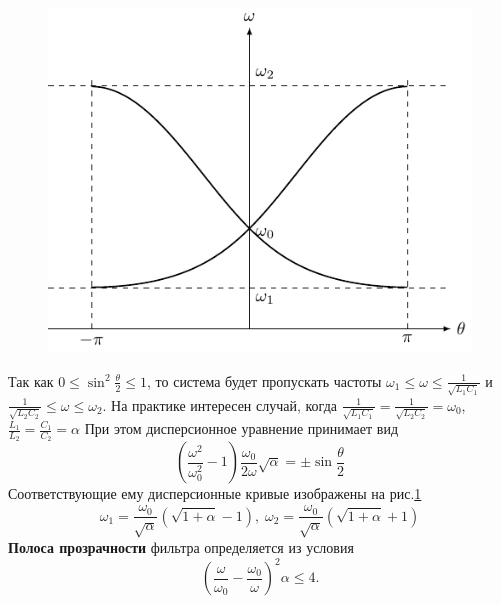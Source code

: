 \begin{figure}[h!]
	\centering 
	\includegraphics[]{chem/FF/w(0).pdf}
	\caption{}
	\label{fig:6.11}
\end{figure}
Так как $\displaystyle 0\leq\sin^2\frac{\theta}{2}\leq1$, то система будет пропускать частоты $\displaystyle\omega_1\leq\omega\leq\frac{1}{\sqrt{L_1C_1}}$ и $\displaystyle \frac{1}{\sqrt{L_2C_2}}\leq\omega\leq\omega_2$. На практике интересен случай, когда $\displaystyle \frac{1}{\sqrt{L_1C_1}}=\frac{1}{\sqrt{L_2C_2}}=\omega_0$, $\displaystyle \frac{L_1}{L_2}=\frac{C_1}{C_2}=\alpha$
При этом дисперсионное уравнение принимает вид
\begin{equation}
\label{eq:7.4}
\left(\frac{\omega^2}{\omega^2_0}-1\right)\frac{\omega_0}{2\omega}\sqrt{\alpha}=\pm\sin\frac{\theta}{2}
\end{equation}
Соответствующие ему дисперсионные кривые изображены на рис.\ref{fig:6.11}
\begin{equation}
\label{eq:7.5}
\omega_1=\frac{\omega_0}{\sqrt{\alpha}}(\sqrt{1+\alpha}-1),\;
\omega_2=\frac{\omega_0}{\sqrt{\alpha}}(\sqrt{1+\alpha}+1)
\end{equation}
\textbf{Полоса прозрачности} фильтра определяется из условия 
\begin{equation}
\label{eq:7.6}
\left(\frac{\omega}{\omega_0}-\frac{\omega_0}{\omega}\right)^2\alpha\leq 4.
\end{equation}
